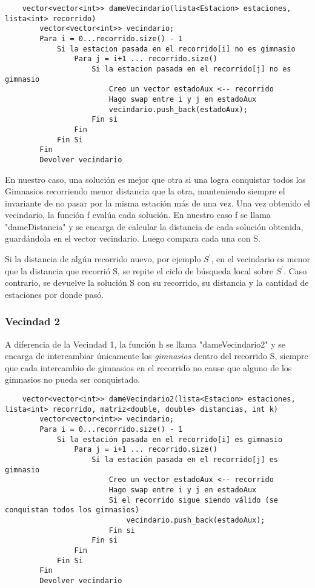     \begin{codesnippet}
	\begin{verbatim}
	vector<vector<int>> dameVecindario(lista<Estacion> estaciones, lista<int> recorrido)
		vector<vector<int>> vecindario;
		Para i = 0...recorrido.size() - 1
			Si la estacion pasada en el recorrido[i] no es gimnasio
				Para j = i+1 ... recorrido.size()
					Si la estacion pasada en el recorrido[j] no es gimnasio
						Creo un vector estadoAux <-- recorrido
						Hago swap entre i y j en estadoAux
						vecindario.push_back(estadoAux);
					Fin si
				Fin
			Fin Si
		Fin
		Devolver vecindario
    \end{verbatim}
    \end{codesnippet}

    En nuestro caso, una solución es mejor que otra si una logra conquistar todos los Gimnasios recorriendo menor distancia que la otra, manteniendo siempre el invariante de no pasar por la misma estación más de una vez. 
	Una vez obtenido el vecindario, la función f evalúa cada solución. En nuestro caso f se llama "dameDistancia" y se encarga de calcular la distancia de cada solución obtenida, guardándola en el vector vecindario. Luego compara cada una con S. 
	\par Si la distancia de algún recorrido nuevo, por ejemplo $S^{'}$, en el vecindario es menor que la distancia que recorrió S, se repite el ciclo de búsqueda local sobre $S^{'}$. Caso contrario, se devuelve la solución S con su recorrido, su distancia y la cantidad de estaciones por donde pasó.

   \subsubsection{Vecindad 2}

    \par A diferencia de la Vecindad 1, la función h se llama "dameVecindario2" y se encarga de intercambiar únicamente los \emph{gimnasios} dentro del recorrido S, siempre que cada intercambio de gimnasios en el recorrido no cause que alguno de los gimnasios no pueda ser conquistado.

    \begin{codesnippet}
	\begin{verbatim}
	vector<vector<int>> dameVecindario2(lista<Estacion> estaciones, lista<int> recorrido, matriz<double, double> distancias, int k)
		vector<vector<int>> vecindario;
		Para i = 0...recorrido.size() - 1
			Si la estación pasada en el recorrido[i] es gimnasio
				Para j = i+1 ... recorrido.size()
					Si la estación pasada en el recorrido[j] es gimnasio
						Creo un vector estadoAux <-- recorrido
						Hago swap entre i y j en estadoAux
						Si el recorrido sigue siendo válido (se conquistan todos los gimnasios)
							vecindario.push_back(estadoAux);
						Fin si
					Fin si
				Fin
			Fin Si
		Fin
		Devolver vecindario
    \end{verbatim}
    \end{codesnippet}

